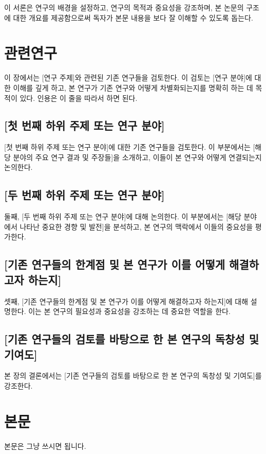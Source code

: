 \documentclass[a4paper,11pt]{article}
\begin{document}
이 서론은 연구의 배경을 설정하고, 연구의 목적과 중요성을 강조하며, 본 논문의 구조에 대한 개요를 제공함으로써 독자가 본문 내용을 보다 잘 이해할 수 있도록 돕는다.

\newpage

\section{관련연구}
이 장에서는 [연구 주제]와 관련된 기존 연구들을 검토한다. 
이 검토는 [연구 분야]에 대한 이해를 깊게 하고, 본 연구가 기존 연구와 어떻게 차별화되는지를 명확히 하는 데 목적이 있다.
인용은 이 줄을 따라서 하면 된다.\cite{buterin2014next,wood2014ethereum}

\subsection{[첫 번째 하위 주제 또는 연구 분야]}
[첫 번째 하위 주제 또는 연구 분야]에 대한 기존 연구들을 검토한다. 
이 부분에서는 [해당 분야의 주요 연구 결과 및 주장들]을 소개하고, 이들이 본 연구와 어떻게 연결되는지 논의한다.

\subsection{[두 번째 하위 주제 또는 연구 분야]}
둘째, [두 번째 하위 주제 또는 연구 분야]에 대해 논의한다. 
이 부분에서는 [해당 분야에서 나타난 중요한 경향 및 발전]을 분석하고, 본 연구의 맥락에서 이들의 중요성을 평가한다.

\subsection{[기존 연구들의 한계점 및 본 연구가 이를 어떻게 해결하고자 하는지]}
셋째, [기존 연구들의 한계점 및 본 연구가 이를 어떻게 해결하고자 하는지]에 대해 설명한다. 
이는 본 연구의 필요성과 중요성을 강조하는 데 중요한 역할을 한다.

\subsection{[기존 연구들의 검토를 바탕으로 한 본 연구의 독창성 및 기여도]}
본 장의 결론에서는 [기존 연구들의 검토를 바탕으로 한 본 연구의 독창성 및 기여도]를 강조한다.



\newpage

\section{본문}
본문은 그냥 쓰시면 됩니다.
\end{document}
